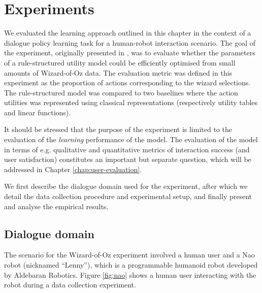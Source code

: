 \section{Experiments}
\label{sec:wozlearning-experiments}

We evaluated the learning approach outlined in this chapter in the context of a dialogue policy learning task for a human-robot interaction scenario.  The goal of the experiment, originally presented in \cite{rulebasedmodels-sigdial2012}, was to evaluate whether the parameters of a rule-structured utility model could be efficiently optimised from small amounts of Wizard-of-Oz data.  The evaluation metric was defined in this experiment as the proportion of actions corresponding to the wizard selections. The rule-structured model was compared to two baselines where the action utilities was represented using classical representations (respectively utility tables and linear functions). %

It should be stressed that the purpose of the experiment is limited to the evaluation of the \textit{learning} performance of the model. The evaluation of the model in terms of e.g. qualitative and quantitative metrics of interaction success (and user satisfaction) constitutes an important but separate question, which will be addressed in Chapter \ref{chap:user-evaluation}. 

We first describe the dialogue domain used for the experiment, after which we detail the data collection procedure and experimental setup, and finally present and analyse the empirical results. 

\subsection{Dialogue domain}
\label{sec:wozlearning-experiments-domain}

The scenario for the Wizard-of-Oz experiment involved a human user and a Nao robot (nicknamed ``Lenny''), which is a programmable humanoid robot developed by Aldebaran Robotics. Figure \ref{fig:nao} shows a human user interacting with the robot during a data collection experiment. 


